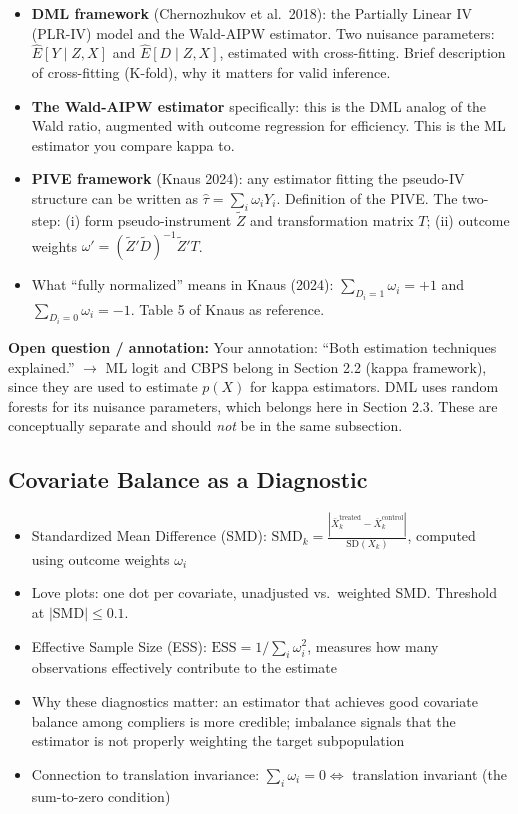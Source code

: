 \documentclass[12pt, a4paper]{article}
\newenvironment{openbox}{%
  \begin{mdframed}[backgroundcolor=greenbg,linecolor=notegreen,linewidth=1pt]%
  \textbf{\color{notegreen}Open question / annotation:} }{%
  \end{mdframed}}
\begin{document}
\begin{itemize}
  \item \textbf{DML framework} (Chernozhukov et al.\ 2018): the Partially Linear IV (PLR-IV) model and the Wald-AIPW estimator. Two nuisance parameters: $\hat{E}[Y \mid Z, X]$ and $\hat{E}[D \mid Z, X]$, estimated with cross-fitting. Brief description of cross-fitting (K-fold), why it matters for valid inference.
  \item \textbf{The Wald-AIPW estimator} specifically: this is the DML analog of the Wald ratio, augmented with outcome regression for efficiency. This is the ML estimator you compare kappa to.
  \item \textbf{PIVE framework} (Knaus 2024): any estimator fitting the pseudo-IV structure can be written as $\hat\tau = \sum_i \omega_i Y_i$. Definition of the PIVE. The two-step: (i) form pseudo-instrument $\tilde{Z}$ and transformation matrix $T$; (ii) outcome weights $\omega' = (\tilde{Z}' \tilde{D})^{-1} \tilde{Z}' T$.
  \item What ``fully normalized'' means in Knaus (2024): $\sum_{D_i=1} \omega_i = +1$ and $\sum_{D_i=0} \omega_i = -1$. Table 5 of Knaus as reference.
\end{itemize}

\begin{openbox}
Your annotation: ``Both estimation techniques explained.'' $\to$ ML logit and CBPS belong in Section 2.2 (kappa framework), since they are used to estimate $p(X)$ for kappa estimators. DML uses random forests for its nuisance parameters, which belongs here in Section 2.3. These are conceptually separate and should \emph{not} be in the same subsection.
\end{openbox}

\subsection{Covariate Balance as a Diagnostic}

\begin{itemize}
  \item Standardized Mean Difference (SMD): $\text{SMD}_k = \frac{|\bar{X}_k^{\text{treated}} - \bar{X}_k^{\text{control}}|}{\text{SD}(X_k)}$, computed using outcome weights $\omega_i$
  \item Love plots: one dot per covariate, unadjusted vs.\ weighted SMD. Threshold at $|$SMD$| \leq 0.1$.
  \item Effective Sample Size (ESS): $\text{ESS} = 1/\sum_i \omega_i^2$, measures how many observations effectively contribute to the estimate
  \item Why these diagnostics matter: an estimator that achieves good covariate balance among compliers is more credible; imbalance signals that the estimator is not properly weighting the target subpopulation
  \item Connection to translation invariance: $\sum_i \omega_i = 0 \Leftrightarrow$ translation invariant (the sum-to-zero condition)
\end{itemize}
\end{document}
